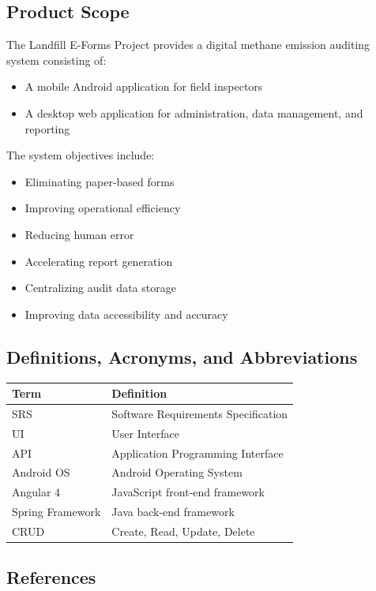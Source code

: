 \documentclass[12pt]{article}
\begin{document}
\subsection{Product Scope}

The Landfill E-Forms Project provides a digital methane emission auditing system consisting of:

\begin{itemize}
\item A mobile Android application for field inspectors
\item A desktop web application for administration, data management, and reporting
\end{itemize}

The system objectives include:

\begin{itemize}
\item Eliminating paper-based forms
\item Improving operational efficiency
\item Reducing human error
\item Accelerating report generation
\item Centralizing audit data storage
\item Improving data accessibility and accuracy
\end{itemize}

\subsection{Definitions, Acronyms, and Abbreviations}

\begin{longtable}{|p{4cm}|p{8cm}|}
\hline
Term & Definition \\ \hline
SRS & Software Requirements Specification \\ \hline
UI & User Interface \\ \hline
API & Application Programming Interface \\ \hline
Android OS & Android Operating System \\ \hline
Angular 4 & JavaScript front-end framework \\ \hline
Spring Framework & Java back-end framework \\ \hline
CRUD & Create, Read, Update, Delete \\ \hline
\end{longtable}

\subsection{References}
\end{document}
